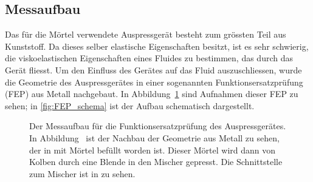 \subsection{Messaufbau}
Das für die Mörtel verwendete Auspressgerät besteht zum grössten Teil aus Kunststoff. Da dieses selber elastische Eigenschaften besitzt, ist es sehr schwierig, die viskoelastischen Eigenschaften eines Fluides zu bestimmen, das durch das Gerät fliesst.
Um den Einfluss des Gerätes auf das Fluid auszuschliessen, wurde die Geometrie des Auspressgerätes in einer sogenannten Funktionsersatzprüfung (FEP) aus Metall nachgebaut. In Abbildung~\ref{fig:FEP} sind Aufnahmen dieser FEP zu sehen; in \ref{fig:FEP_schema} ist der Aufbau schematisch dargestellt.
%
\begin{figure}[hbt]
    \centering
    \caption{Der Messaufbau für die Funktionsersatzprüfung des Auspressgerätes.
    In Abbildung~ ist der Nachbau der Geometrie aus Metall zu sehen, der in  mit Mörtel befüllt worden ist.
    Dieser Mörtel wird dann von Kolben durch eine Blende in den Mischer gepresst. Die Schnittstelle zum Mischer ist in  zu sehen.}
    \label{fig:FEP}
\end{figure}
%
